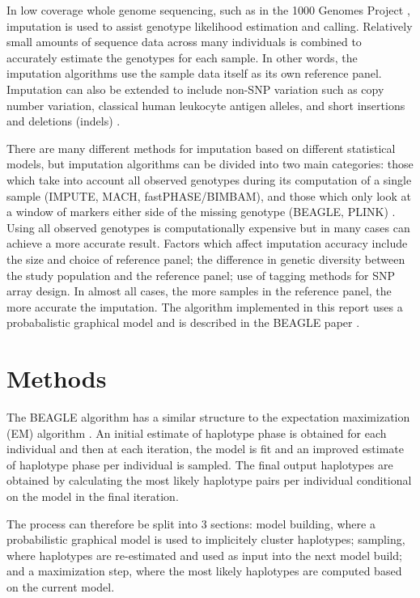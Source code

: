 \documentclass[a4paper,11pt,twoside,abstraction,titlepage]{article}
\begin{document}
In low coverage whole genome sequencing, such as in the 1000 Genomes Project \cite{1000genomes}, imputation is used to assist genotype likelihood estimation and calling.  Relatively small amounts of sequence data across many individuals is combined to accurately estimate the genotypes for each sample.  In other words, the imputation algorithms use the sample data itself as its own reference panel.  Imputation can also be extended to include non-SNP variation such as copy number variation, classical human leukocyte antigen alleles, and short insertions and deletions (indels) \cite{review2010}.

There are many different methods for imputation based on different statistical models, but imputation algorithms can be divided into two main categories: those which take into account all observed genotypes during its computation of a single sample (IMPUTE, MACH, fastPHASE/BIMBAM), and those which only look at a window of markers either side of the missing genotype (BEAGLE, PLINK) \cite{review2009}.  Using all observed genotypes is computationally expensive but in many cases can achieve a more accurate result.  Factors which affect imputation accuracy include the size and choice of reference panel; the difference in genetic diversity between the study population and the reference panel; use of tagging methods for SNP array design.  In almost all cases, the more samples in the reference panel, the more accurate the imputation.  The algorithm implemented in this report uses a probabalistic graphical model and is described in the BEAGLE paper \cite{beagle3}.


\newpage
\section{Methods}
The BEAGLE algorithm has a similar structure to the expectation maximization (EM) algorithm \cite{EMalgorithm}.  An initial estimate of haplotype phase is obtained for each individual and then at each iteration, the model is fit and an improved estimate of haplotype phase per individual is sampled.  The final output haplotypes are obtained by calculating the most likely haplotype pairs per individual conditional on the model in the final iteration.

The process can therefore be split into 3 sections: model building, where a probabilistic graphical model is used to implicitely cluster haplotypes; sampling, where haplotypes are re-estimated and used as input into the next model build; and a maximization step, where the most likely haplotypes are computed based on the current model.
\end{document}
